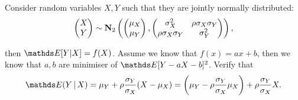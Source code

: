 \begin{exercise} Consider random variables $X,Y$ such that they are jointly normally distributed:
\begin{equation}
    \begin{pmatrix} X \\ Y\end{pmatrix} \sim \mathbf{N}_{2} \left(  \begin{pmatrix} \mu_X \\ \mu_Y \end{pmatrix}, \begin{pmatrix} \sigma_X^2 & \rho \sigma_X \sigma_Y \\ \rho \sigma_X \sigma_Y & \sigma_Y^2 \end{pmatrix} \right),
\end{equation}

then $\E[Y|X] = f(X)$. Assume we know that $f(x) = ax+b$, then we know that $a,b$ are minimiser of $\E[Y - aX - b]^2$. Verify that
\begin{equation}
    \E(Y\,|\,X) = \mu_Y + \rho \frac{\sigma_Y}{\sigma_X}(X - \mu_X) = \bracket{\mu_Y - \rho \frac{\sigma_Y}{\sigma_X}\mu_X} + \rho \frac{\sigma_Y}{\sigma_X} X.
\end{equation}
\end{exercise}
\
